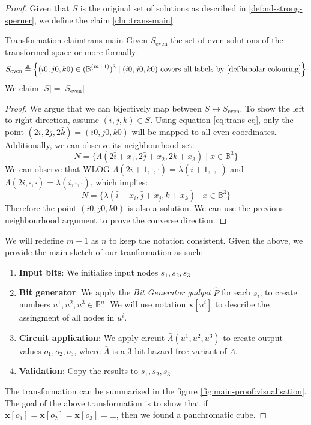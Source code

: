 \begin{proof}
Given that $S$ is the original set of solutions as described in \ref{def:nd-strong-sperner}, we define the claim \ref{clm:trans-main}.

\begin{claimbox}{Transformation claim}{trans-main}
    \label{clm:main-proof:trans-claim}
    Given $S_{\text{even}}$ the set of even solutions of the transformed space or more formally:
    $$
        S_{\text{even}} \triangleq
        \Big\{(i0,j0,k0) \in (\mathbb{B}^{(m+1)})^3 \mid (i0,j0,k0) \text{ covers all labels by \ref{def:bipolar-colouring}} \Big\}
    $$
    We claim $|S| = |S_{\text{even}}|$
\end{claimbox}

\begin{proof}
    We argue that we can bijectively map between $S \leftrightarrow S_{\text{even}}$.
    To show the left to right direction, assume $(i,j,k) \in S$.
    Using equation \ref{eq:trans-eq}, only the point $(2\bar{i}, 2\bar{j}, 2\bar{k}) = (i0, j0,k0)$ will be mapped to all even coordinates.
    Additionally, we can observe its neighbourhood set:
    $$
    N = \Big\{\Lambda(2\bar{i} + x_1, 2\bar{j} + x_2, 2\bar{k} + x_3) \mid x \in \mathbb{B}^3 \Big\}
    $$
    We can observe that WLOG $\Lambda(2\bar{i} + 1, \cdot, \cdot) = \lambda(\bar{i} + 1, \cdot, \cdot)$ and
    $\Lambda(2\bar{i}, \cdot, \cdot) = \lambda(\bar{i}, \cdot, \cdot)$, which implies:
    $$
    N = \Big\{\lambda(\bar{i} + x_i, \bar{j} + x_j, \bar{k} + x_k) \mid x \in \mathbb{B}^3 \Big\}
    $$
    Therefore the point $(i0, j0,k0)$ is also a solution. We can use the previous neighbourhood argument to prove the converse direction.
\end{proof}
We will redefine $m + 1$ as $n$ to keep the notation consistent.
Given the above, we provide the main sketch of our tranformation as such:
\begin{enumerate}
    \item \textbf{Input bits}: We initialise input nodes $s_1, s_2, s_3$
    \item \textbf{Bit generator}: We apply the \textit{Bit Generator gadget} $\hat{P}$ for each $s_i$,
        to create numbers $u^1, u^2, u^3 \in \mathbb{B}^{n}$.  We will use notation $\mathbf{x}[u^i]$ to
        describe the assingment of all nodes in $u^i$.
    \item \textbf{Circuit application}: We apply circuit $\bar{\Lambda}(u^1, u^2, u^3)$ to create output values $o_1, o_2, o_3$, where 
$\bar{\Lambda}$ is a 3-bit hazard-free variant of $\Lambda$.
    \item \textbf{Validation}: Copy the results to $s_1, s_2, s_3$
\end{enumerate}
The transformation can be summarised in the figure \ref{fig:main-proof:visualisation}.
The goal of the above transformation is to show that if $\mathbf{x}[o_1] = \mathbf{x}[o_2] = \mathbf{x}[o_3] = \bot$, then we found a panchromatic cube.


\end{proof}
